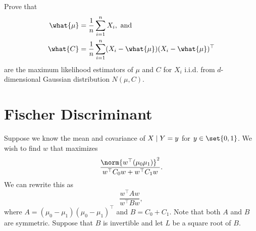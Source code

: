 
\begin{exercise}
    Prove that \begin{align*}
        \what{\mu} &= \frac{1}{n} \sum_{i=1}^n X_i, \text{ and} \\
        \what{C} &= \frac{1}{n} \sum_{i=1}^n (X_i - \what{\mu}) (X_i - \what{\mu})^\top
    \end{align*}
    are the maximum likelihood estimators of $\mu$ and $C$ for $X_i$ i.i.d.
    from $d$-dimensional Gaussian distribution $N(\mu, C)$.
\end{exercise}

\section{Fischer Discriminant} \label{sec:fischer_discriminant}
Suppose we know the mean and covariance of $X \mid Y = y$ for
$y \in \set{0, 1}$.
We wish to find $w$ that maximizes \[
    \frac{\norm{w^\top (\mu_0 \mu_1)}^2}{w^\top C_0 w + w^\top C_1 w}.
\] We can rewrite this as \[
    \frac{w^\top A w}{w^\top B w},
\] where $A = (\mu_0 - \mu_1) (\mu_0 - \mu_1)^\top$ and $B = C_0 + C_1$.
Note that both $A$ and $B$ are symmetric.
Suppose that $B$ is invertible and let $L$ be a square root of $B$.

